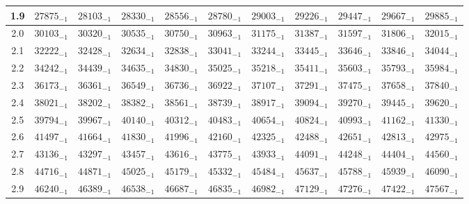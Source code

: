 \documentclass[10pt, a4paper]{article}
\begin{document}
\begin{center}
\begin{longtable}{c || c c c c c | c c c c c}
        1.9 & \({27875}_{-1}\) & \({28103}_{-1}\) & \({28330}_{-1}\) & \({28556}_{-1}\) & \({28780}_{-1}\) & \({29003}_{-1}\) & \({29226}_{-1}\) & \({29447}_{-1}\) & \({29667}_{-1}\) & \({29885}_{-1}\)\\
        \hline
        2.0 & \({30103}_{-1}\) & \({30320}_{-1}\) & \({30535}_{-1}\) & \({30750}_{-1}\) & \({30963}_{-1}\) & \({31175}_{-1}\) & \({31387}_{-1}\) & \({31597}_{-1}\) & \({31806}_{-1}\) & \({32015}_{-1}\)\\
        2.1 & \({32222}_{-1}\) & \({32428}_{-1}\) & \({32634}_{-1}\) & \({32838}_{-1}\) & \({33041}_{-1}\) & \({33244}_{-1}\) & \({33445}_{-1}\) & \({33646}_{-1}\) & \({33846}_{-1}\) & \({34044}_{-1}\)\\
        2.2 & \({34242}_{-1}\) & \({34439}_{-1}\) & \({34635}_{-1}\) & \({34830}_{-1}\) & \({35025}_{-1}\) & \({35218}_{-1}\) & \({35411}_{-1}\) & \({35603}_{-1}\) & \({35793}_{-1}\) & \({35984}_{-1}\)\\
        2.3 & \({36173}_{-1}\) & \({36361}_{-1}\) & \({36549}_{-1}\) & \({36736}_{-1}\) & \({36922}_{-1}\) & \({37107}_{-1}\) & \({37291}_{-1}\) & \({37475}_{-1}\) & \({37658}_{-1}\) & \({37840}_{-1}\)\\
        2.4 & \({38021}_{-1}\) & \({38202}_{-1}\) & \({38382}_{-1}\) & \({38561}_{-1}\) & \({38739}_{-1}\) & \({38917}_{-1}\) & \({39094}_{-1}\) & \({39270}_{-1}\) & \({39445}_{-1}\) & \({39620}_{-1}\)\\
        2.5 & \({39794}_{-1}\) & \({39967}_{-1}\) & \({40140}_{-1}\) & \({40312}_{-1}\) & \({40483}_{-1}\) & \({40654}_{-1}\) & \({40824}_{-1}\) & \({40993}_{-1}\) & \({41162}_{-1}\) & \({41330}_{-1}\)\\
        2.6 & \({41497}_{-1}\) & \({41664}_{-1}\) & \({41830}_{-1}\) & \({41996}_{-1}\) & \({42160}_{-1}\) & \({42325}_{-1}\) & \({42488}_{-1}\) & \({42651}_{-1}\) & \({42813}_{-1}\) & \({42975}_{-1}\)\\
        2.7 & \({43136}_{-1}\) & \({43297}_{-1}\) & \({43457}_{-1}\) & \({43616}_{-1}\) & \({43775}_{-1}\) & \({43933}_{-1}\) & \({44091}_{-1}\) & \({44248}_{-1}\) & \({44404}_{-1}\) & \({44560}_{-1}\)\\
        2.8 & \({44716}_{-1}\) & \({44871}_{-1}\) & \({45025}_{-1}\) & \({45179}_{-1}\) & \({45332}_{-1}\) & \({45484}_{-1}\) & \({45637}_{-1}\) & \({45788}_{-1}\) & \({45939}_{-1}\) & \({46090}_{-1}\)\\
        2.9 & \({46240}_{-1}\) & \({46389}_{-1}\) & \({46538}_{-1}\) & \({46687}_{-1}\) & \({46835}_{-1}\) & \({46982}_{-1}\) & \({47129}_{-1}\) & \({47276}_{-1}\) & \({47422}_{-1}\) & \({47567}_{-1}\)\\

\end{longtable}
\end{center}
\end{document}
